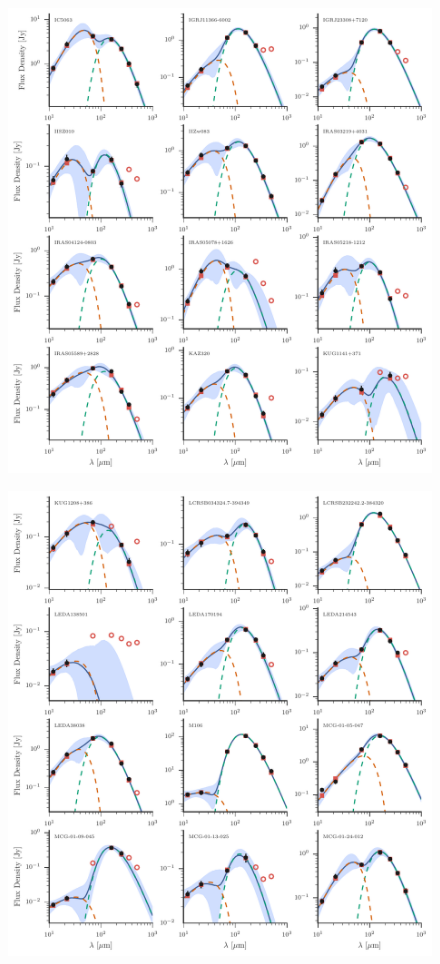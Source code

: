 \begin{figure}
\centering
\includegraphics[width=\textwidth]{figures/sedfig12}
\caption{}
\end{figure}

\begin{figure}
\centering
\includegraphics[width=\textwidth]{figures/sedfig13}
\caption{}
\end{figure}

